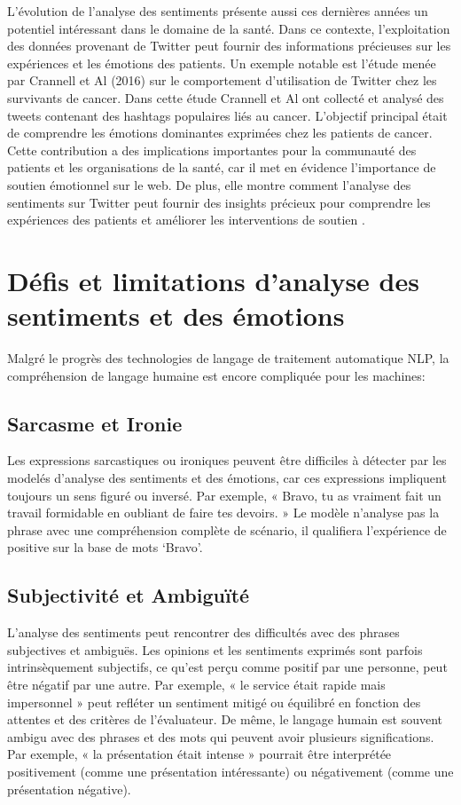 L’évolution de l’analyse des sentiments présente aussi ces dernières années un potentiel intéressant dans le domaine de la santé. Dans ce contexte, l’exploitation des données provenant de Twitter peut fournir des informations précieuses sur les expériences et les émotions des patients. Un exemple notable est l’étude menée par Crannell et Al (2016) sur le comportement d’utilisation de Twitter chez les survivants de cancer. Dans cette étude Crannell et Al ont collecté et analysé des tweets contenant des hashtags populaires liés au cancer. L’objectif principal était de comprendre les émotions dominantes exprimées chez les patients de cancer. Cette contribution a des implications importantes pour la communauté des patients et les organisations de la santé, car il met en évidence l’importance de soutien émotionnel sur le web. De plus, elle montre comment l’analyse des sentiments sur Twitter peut fournir des insights précieux pour comprendre les expériences des patients et améliorer les interventions de soutien \cite{crannell2016cancer}.

\section{Défis et limitations d'analyse des sentiments et des émotions}
Malgré le progrès des technologies de langage de traitement automatique NLP, la compréhension de langage humaine est encore compliquée pour les machines:

\subsection{Sarcasme et Ironie}
Les expressions sarcastiques ou ironiques peuvent être difficiles à détecter par les modelés d’analyse des sentiments et des émotions, car ces expressions impliquent toujours un sens figuré ou inversé. Par exemple, « Bravo, tu as vraiment fait un travail formidable en oubliant de faire tes devoirs. »
Le modèle n’analyse pas la phrase avec une compréhension complète de scénario, il qualifiera l’expérience de positive sur la base de mots ‘Bravo’.  


\subsection{Subjectivité et Ambiguïté}
 L’analyse des sentiments peut rencontrer des difficultés avec des phrases subjectives et ambiguës. Les opinions et les sentiments exprimés sont parfois intrinsèquement subjectifs, ce qu’est perçu comme positif par une personne, peut être négatif par une autre. Par exemple, « le service était rapide mais impersonnel » peut refléter un sentiment mitigé ou équilibré en fonction des attentes et des critères de l’évaluateur. De même, le langage humain est souvent ambigu avec des phrases et des mots qui peuvent avoir plusieurs significations. Par exemple, « la présentation était intense » pourrait être interprétée positivement (comme une présentation intéressante) ou négativement (comme une présentation négative).     

